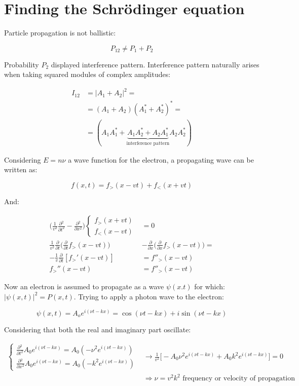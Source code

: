 \section{Finding the Schr\"odinger equation}
Particle propagation is not ballistic:

$$P_{12} \neq P_1 + P_2$$

Probability $P_2$ displayed interference pattern.
Interference pattern naturally arises when taking squared modules of complex amplitudes:

\begin{align*}
  I_{12} &= |A_1 + A_2|^2=\\
         &=(A_1 + A_2)(A_1^*+A_2^*)^*=\\
         &=(A_1A_1^*+\underbrace{A_1A_2^*+A_2A_1^*}_{\text{interference pattern}}A_2A_2^*)
\end{align*}

Considering $E=n\nu$ a wave function for the electron, a propagating wave can be written as:

$$f(x,t) = f_>(x-vt)+f_<(x+vt)$$

And:

\begin{align*}
  \biggl(\frac{1}{v^2}\frac{\partial {^2}}{\partial {t^2}}-\frac{\partial {^2}}{\partial {x^2}}\biggr)\begin{cases}f_>(x+vt)\\f_<(x-vt)\end{cases} &= 0\\
  \frac{1}{v^2}\frac{\partial {}}{\partial {t}}\biggl(\frac{\partial {}}{\partial {t}}f_>(x-vt)\biggr)&-\frac{\partial {}}{\partial {x}}\biggl(\frac{\partial {}}{\partial {x}}f_>(x-vt)\biggr)=\\
  -\frac{1}{v}\frac{\partial {}}{\partial {t}}[f_>'(x-vt)]&=f''_>(x-vt)\\
  f_>''(x-vt) &=f''_>(x-vt)
\end{align*}

Now an electron is assumed to propagate as a wave $\psi(x.t)$ for which: $|\psi(x,t)|^2 = P(x,t)$.
Trying to apply a photon wave to the electron:

$$\psi(x,t) = A_oe^{i(\nu t-kx)} = \cos(\nu t-kx) + i\sin(\nu t - kx)$$

Considering that both the real and imaginary part oscillate:

\begin{align*}
  \begin{cases}\frac{\partial {^2}}{\partial {t^2}}A_0e^{i(\nu t-kx)} = A_0(-\nu^2e^{i(\nu t-kx)})\\\frac{\partial {^2}}{\partial {x^2}}A_0e^{i(\nu t-kx)} = A_0(-k^2e^{i(\nu t-kx)})\end{cases}&\rightarrow \frac{1}{v^2}\biggl[-A_0\nu^2e^{i(\nu t -kx)}+A_0k^2e^{i(\nu t-kx)}\biggr] = 0\\
                                                                                                                                                                                  &\Rightarrow \nu = v^2k^2\text{ frequency or velocity of propagation}
\end{align*}

